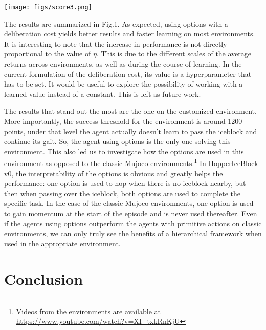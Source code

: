 \documentclass{article}
\begin{document}
\begin{figure*}[ht]
  \centering

  \texttt{[image: figs/score3.png]}
  \caption{Results in Mujocco using 12 different random seeds for a total of 1 million steps (each iteration is 2000 steps)}
\end{figure*}




The results are summarized in Fig.1. As expected, using options with a deliberation cost yields better results and faster learning on most environments. It is interesting to note that the increase in performance is not directly proportional to the value of $\eta$. This is due to the different scales of the average returns across  environments, as well as during the course of learning. In the current formulation of the deliberation cost, its value is a hyperparameter that has to be set. It would be useful to explore the possibility of working with a learned value instead of a constant. This is left as future work.

The results that stand out the most are the one on the customized environment. More importantly, the success threshold for the environment is around 1200 points, under that level the agent actually doesn't learn to pass the iceblock and continue its gait.  So, the agent using options is the only one solving this environment. This also led us to investigate how the options are used in this environment as opposed to the classic Mujoco environments.\footnote{Videos from the environments are available at \url{https://www.youtube.com/watch?v=XI_txkRnKjU}} In HopperIceBlock-v0, the interpretability of the options is obvious and greatly helps the performance: one option is used to hop when there is no iceblock nearby, but then when passing over the iceblock, both options are used to complete the specific task. 
In the case of the classic Mujoco environments, one option is used to gain momentum at the start of the episode and is never used thereafter. Even if the agents using options outperform the agents with primitive actions on classic environments, we can only truly see the benefits of a hierarchical framework when used in the appropriate environment. 

\section{Conclusion}
\end{document}
